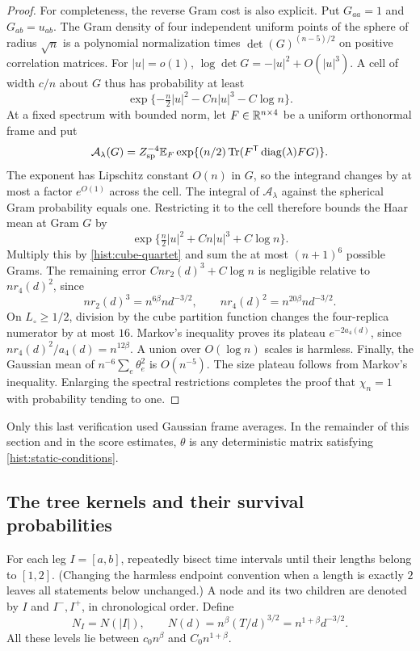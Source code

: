 \begin{proof}
For completeness, the reverse Gram cost is also explicit.  Put
$G_{aa}=1$ and $G_{ab}=u_{ab}$.  The Gram density of four independent
uniform points of the sphere of radius $\sqrt n$ is a polynomial
normalization times $\det(G)^{(n-5)/2}$ on positive correlation matrices.
For $|u|=o(1)$,
$\log\det G=-|u|^2+O(|u|^3)$.  A cell of width $c/n$ about $G$ thus has
probability at least
\[
 \exp\{-\tfrac n2|u|^2-Cn|u|^3-C\log n\}.
\]
At a fixed spectrum with bounded norm, let $F\in\mathbb R^{n\times4}$ be a uniform
orthonormal frame and put
\[
 \mathcal A_\lambda(G)=Z_{\rm sp}^{-4}\mathbb E_F
      \exp\{(n/2)\operatorname{Tr}(F^{\mathsf T}\operatorname{diag}(\lambda)F G)\}.
\]
The exponent has Lipschitz constant $O(n)$ in $G$, so the integrand changes
by at most a factor $e^{O(1)}$ across the cell.  The integral of
$\mathcal A_\lambda$ against the spherical Gram probability equals one.
Restricting it to the cell therefore bounds the Haar mean at Gram $G$ by
\[
 \exp\{\tfrac n2|u|^2+Cn|u|^3+C\log n\}.
\]
Multiply this by \eqref{hist:cube-quartet} and sum the at most $(n+1)^6$
possible Grams.  The remaining error $Cnr_2(d)^3+C\log n$ is negligible
relative to $nr_4(d)^2$, since
\[
 nr_2(d)^3=n^{6\beta}nd^{-3/2},\qquad
 nr_4(d)^2=n^{20\beta}nd^{-3/2}.
\]
On $L_\circ\ge1/2$, division by the cube partition function changes the
four-replica numerator by at most $16$.  Markov's inequality proves its
plateau $e^{-2a_4(d)}$, since $nr_4(d)^2/a_4(d)=n^{12\beta}$.  A union over
$O(\log n)$ scales is harmless.  Finally, the Gaussian mean of
$n^{-6}\sum_e\theta_e^2$ is $O(n^{-5})$.  The size plateau follows from
Markov's inequality.  Enlarging the spectral restrictions completes the
proof that $\chi_n=1$ with probability tending to one.
\end{proof}

Only this last verification used Gaussian frame averages.  In the remainder
of this section and in the score estimates, $\theta$ is any deterministic
matrix satisfying \eqref{hist:static-conditions}.

\subsection{The tree kernels and their survival probabilities}

For each leg $I=[a,b]$, repeatedly bisect time intervals until their lengths
belong to $[1,2]$.  (Changing the harmless endpoint convention when a length
is exactly $2$ leaves all statements below unchanged.)  A node and its two
children are denoted by $I$ and $I^-,I^+$, in chronological order.  Define
\begin{equation}\label{hist:node-level}
 N_I=N(|I|),\qquad N(d)=n^\beta(T/d)^{3/2}=n^{1+\beta}d^{-3/2}.
\end{equation}
All these levels lie between $c_0n^\beta$ and $C_0n^{1+\beta}$.

